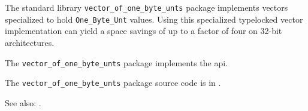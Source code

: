 
The standard library {\tt vector\_of\_one\_byte\_unts} package implements vectors specialized to hold 
{\tt One\_Byte\_Unt} values.  Using this specialized typelocked vector implementation can 
yield a space savings of up to a factor of four on 32-bit architectures.

The {\tt vector\_of\_one\_byte\_unts} package implements the  api.

The {\tt vector\_of\_one\_byte\_unts} package source code is in .

See also:   .
